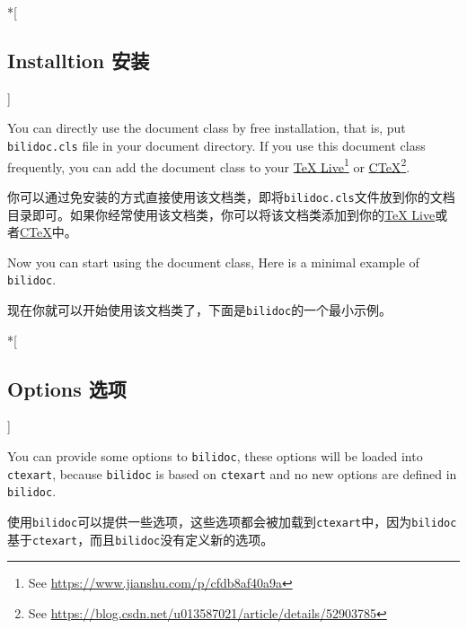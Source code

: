 \begin{ParaColumn}

    \switchcolumn[0]*[\subsection{Installtion 安装}]

    You can directly use the document class by free installation, that is, put \verb"bilidoc.cls" file in your document directory.  If you use this document class frequently, you can add the document class to your \href{http://tug.org/texlive/}{\TeX{} Live}\footnote{See \url{https://www.jianshu.com/p/cfdb8af40a9a}} or \href{http://www.ctex.org/}{C\TeX{}}\footnote{See \url{https://blog.csdn.net/u013587021/article/details/52903785}}.

    \switchcolumn

    你可以通过免安装的方式直接使用该文档类，即将\verb"bilidoc.cls"文件放到你的文档目录即可。如果你经常使用该文档类，你可以将该文档类添加到你的\href{http://tug.org/texlive/}{\TeX{} Live}或者\href{http://www.ctex.org/}{C\TeX{}}中。


    Now you can start using the document class, Here is a minimal example of \verb"bilidoc".

    \switchcolumn

    现在你就可以开始使用该文档类了，下面是\verb"bilidoc"的一个最小示例。

    \CrossColumnText{
        
    }
    \switchcolumn[0]*[\subsection{Options 选项}]

    You  can provide some options to \verb"bilidoc", these options will be loaded into \verb"ctexart", because \verb"bilidoc" is based on \verb"ctexart" and no new options are defined in \verb"bilidoc".

    \switchcolumn

    使用\verb"bilidoc"可以提供一些选项，这些选项都会被加载到\verb"ctexart"中，因为\verb"bilidoc"基于\verb"ctexart"，而且\verb"bilidoc"没有定义新的选项。

\end{ParaColumn}